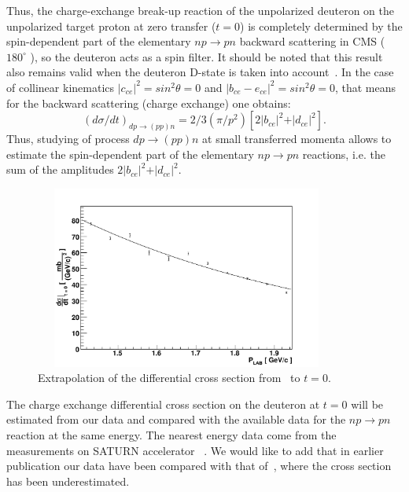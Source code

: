 \documentclass[a4paper,12pt]{article}
\begin{document}
Thus, the charge-exchange break-up reaction of the unpolarized deuteron on the
unpolarized target proton at zero transfer ($t = 0 $) is completely determined
by the spin-dependent part of the elementary $np \to pn$ backward scattering in
CMS ( $180^{\circ}$ ), so the deuteron acts as a spin filter. It should be noted
that this result also remains valid when the deuteron D-state is taken into
account~\cite{a2}. In the case of collinear kinematics
$\vert c_{ce}\vert ^2 = sin^2 \theta = 0$ and $\vert b_{ce}-e_{ce}\vert ^2 =
sin^2 \theta = 0$, that means for the backward scattering (charge exchange) one
obtains:
\begin{displaymath}
  (d \sigma /dt)_{dp\rightarrow(pp)n} = 2/3 (\pi/p^{2})[ 2\vert b_{ce}
    \vert ^{2}+ \vert d_{ce} \vert ^{2}].
\end{displaymath}
Thus, studying of process $dp \to (pp) n $ at small transferred momenta allows
to estimate the spin-dependent part of the elementary $np \to pn $ reactions,
i.e. the sum of the amplitudes
$2 \vert b _ {ce} \vert ^2 + \vert d _ {ce} \vert ^2 $.
\begin{figure}[!hbp]
  \begin{center}
    \includegraphics[angle=0,height=6cm, width=10cm]{fig_bizard.pdf}
    \caption {Extrapolation of the differential cross section from~\cite{a12}
      to $t=0$.}
    \label{f_biz}
  \end{center}
\end{figure}

The charge exchange differential cross section on the deuteron at $ t=0 $ will
be estimated from our data and compared with the available data for the
$ np \to pn $ reaction at the same energy. The nearest energy data come from the
measurements on SATURN accelerator ~\cite{a12,a13}. We would like to add that in
earlier publication \cite {a6} our data have been compared with that
of~\cite{a17}, where the cross section has been underestimated.
\end{document}
